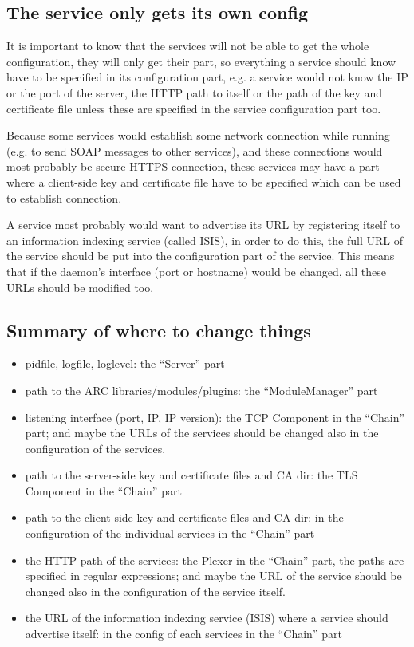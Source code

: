 \documentclass{article}
\begin{document}
\subsection{The service only gets its own config}

It is important to know that the services will not be able to get the whole configuration, they will only get their part, so everything a service should know have to be specified in its configuration part, e.g. a service would not know the IP or the port of the server, the HTTP path to itself or the path of the key and certificate file unless these are specified in the service configuration part too.

Because some services would establish some network connection while running (e.g. to send SOAP messages to other services), and these connections would most probably be secure HTTPS connection, these services may have a part where a client-side key and certificate file have to be specified which can be used to establish connection.

A service most probably would want to advertise its URL by registering itself to an information indexing service (called ISIS), in order to do this, the full URL of the service should be put into the configuration part of the service. This means that if the daemon's interface (port or hostname) would be changed, all these URLs should be modified too.


\subsection{Summary of where to change things}
\begin{itemize}
	\item pidfile, logfile, loglevel: the “Server” part
	\item path to the ARC libraries/modules/plugins: the “ModuleManager” part
	\item listening interface (port, IP, IP version): the TCP Component in the “Chain” part; and maybe the URLs of the services should be changed also in the configuration of the services.
	\item path to the server-side key and certificate files and CA dir: the TLS Component in the “Chain” part
	\item path to the client-side key and certificate files and CA dir: in the configuration of the individual services in the “Chain” part
	\item the HTTP path of the services: the Plexer in the “Chain” part, the paths are specified in regular expressions; and maybe the URL of the service should be changed also in the configuration of the service itself.
	\item the URL of the information indexing service (ISIS) where a service should advertise itself: in the config of each services in the “Chain” part
\end{itemize}
\end{document}
